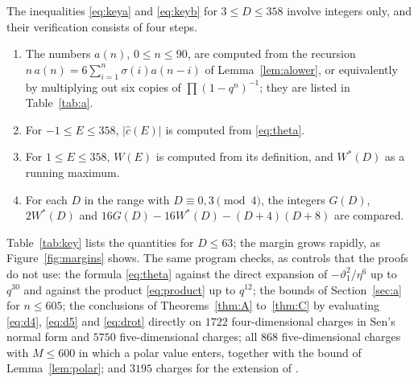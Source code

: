 \documentclass[11pt]{amsart}
\theoremstyle{definition}
\newcommand{\cc}{\hat c}
\newcommand{\vt}{\vartheta}
\newcommand{\Kzero}{90}
\begin{document}
The inequalities \eqref{eq:keya} and \eqref{eq:keyb} for $3\le D\le358$ involve integers only, and their verification consists of four steps.
\begin{enumerate}
\item[(F1)] The numbers $a(n)$, $0\le n\le\Kzero$, are computed from the recursion $n\,a(n)=6\sum_{i=1}^n\sigma(i)a(n-i)$ of Lemma~\ref{lem:alower}, or equivalently by multiplying out six copies of $\prod(1-q^n)^{-1}$; they are listed in Table~\ref{tab:a}.
\item[(F2)] For $-1\le E\le 358$, $|\cc(E)|$ is computed from \eqref{eq:theta}.
\item[(F3)] For $1\le E\le358$, $W(E)$ is computed from its definition, and $W^*(D)$ as a running maximum.
\item[(F4)] For each $D$ in the range with $D\equiv0,3\pmod 4$, the integers $G(D)$, $2W^*(D)$ and $16G(D)-16W^*(D)-(D+4)(D+8)$ are compared.
\end{enumerate}
Table~\ref{tab:key} lists the quantities for $D\le63$; the margin grows rapidly, as Figure~\ref{fig:margins} shows. The same program checks, as controls that the proofs do not use: the formula \eqref{eq:theta} against the direct expansion of $-\vt_1^2/\eta^6$ up to $q^{30}$ and against the product \eqref{eq:product} up to $q^{12}$; the bounds of Section~\ref{sec:a} for $n\le605$; the conclusions of Theorems~\ref{thm:A} to~\ref{thm:C} by evaluating \eqref{eq:d4}, \eqref{eq:d5} and \eqref{eq:drot} directly on $1722$ four-dimensional charges in Sen's normal form and $5750$ five-dimensional charges; all $868$ five-dimensional charges with $M\le600$ in which a polar value enters, together with the bound of Lemma~\ref{lem:polar}; and $3195$ charges for the extension of \cite{MMS99}.
\end{document}
